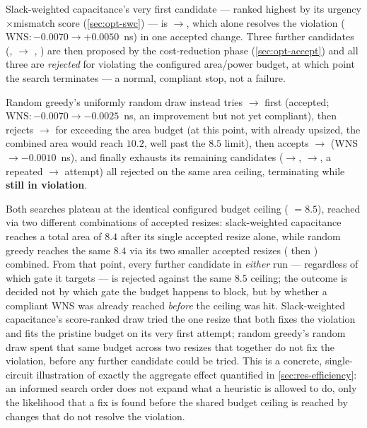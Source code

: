 Slack-weighted capacitance's very first candidate --- ranked highest by
its urgency$\times$mismatch score (\cref{sec:opt-swc}) --- is
$\rightarrow$, which alone resolves the
violation ($\mathrm{WNS}: -0.0070 \rightarrow +0.0050$~ns) in one accepted
change. Three further candidates (, $\rightarrow$
, ) are then proposed by the cost-reduction phase
(\cref{sec:opt-accept}) and all three are \emph{rejected} for violating the
configured area/power budget, at which point the search terminates
 --- a normal, compliant stop, not a failure.

Random greedy's uniformly random draw instead tries $\rightarrow$ first (accepted; $\mathrm{WNS}:
-0.0070\rightarrow-0.0025$~ns, an improvement but not yet compliant), then
rejects $\rightarrow$ for exceeding the area
budget (at this point, with  already upsized, the combined area
would reach $10.2$, well past the $8.5$ limit), then accepts $\rightarrow$ (WNS$\rightarrow-0.0010$~ns), and finally
exhausts its remaining candidates ($\rightarrow$,
$\rightarrow$, a repeated $\rightarrow$
attempt) all rejected on the same area ceiling, terminating
 while \textbf{still in violation}.

Both searches plateau at the identical configured budget ceiling
( $= 8.5$), reached via two different combinations of
accepted resizes: slack-weighted capacitance reaches a total area of
$8.4$ after its single accepted  resize alone, while random
greedy reaches the same $8.4$ via its two smaller accepted resizes
( then ) combined. From that point, every further
candidate in \emph{either} run --- regardless of which gate it targets ---
is rejected against the same $8.5$ ceiling; the outcome is decided not by
which gate the budget happens to block, but by whether a compliant WNS was
already reached \emph{before} the ceiling was hit. Slack-weighted
capacitance's score-ranked draw tried the one resize that both fixes the
violation and fits the pristine budget on its very first attempt; random
greedy's random draw spent that same budget across two resizes that
together do not fix the violation, before any further candidate could be
tried. This is a concrete, single-circuit illustration of exactly the
aggregate effect quantified in \cref{sec:res-efficiency}: an informed
search order does not expand what a heuristic is allowed to do, only the
likelihood that a fix is found before the shared budget ceiling is
reached by changes that do not resolve the violation.

